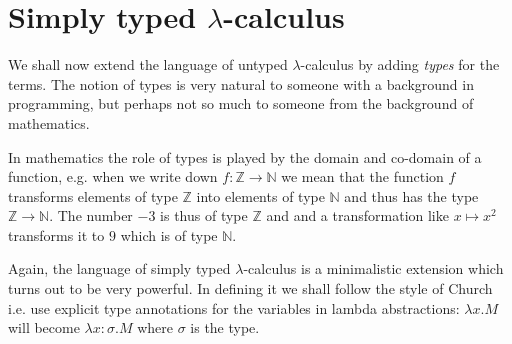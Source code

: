 \section{Simply typed $\lambda$-calculus}

We shall now extend the language of untyped $\lambda$-calculus by
adding \emph{types} for the terms. The notion of types is very natural to
someone with a background in programming, but perhaps not so much to someone
from the background of mathematics.

In mathematics the role of types is played by the domain and co-domain of a
function, e.g. when we write down $f: \mathbb{Z} \rightarrow \mathbb{N}$ we
mean that the function $f$ transforms elements of type $\mathbb{Z}$ into
elements of type $\mathbb{N}$ and thus has the type $\mathbb{Z} \rightarrow
\mathbb{N}$. The number $-3$ is thus of type $\mathbb{Z}$ and and a transformation like
$x \mapsto x^2$ transforms it to $9$ which is of type $\mathbb{N}$.

Again, the language of simply typed $\lambda$-calculus is a minimalistic
extension which turns out to be very powerful. In defining it we shall follow
the style of Church i.e. use explicit type annotations for the variables in lambda
abstractions: $\lambda x. M$ will become $\lambda x:\sigma. M$ where
$\sigma$ is the type.

